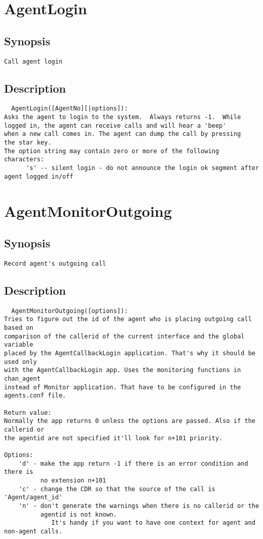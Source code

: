 \section{AgentLogin}
\subsection{Synopsis}
\begin{verbatim}
Call agent login
\end{verbatim}
\subsection{Description}
\begin{verbatim}
  AgentLogin([AgentNo][|options]):
Asks the agent to login to the system.  Always returns -1.  While
logged in, the agent can receive calls and will hear a 'beep'
when a new call comes in. The agent can dump the call by pressing
the star key.
The option string may contain zero or more of the following characters:
      's' -- silent login - do not announce the login ok segment after agent logged in/off

\end{verbatim}


\section{AgentMonitorOutgoing}
\subsection{Synopsis}
\begin{verbatim}
Record agent's outgoing call
\end{verbatim}
\subsection{Description}
\begin{verbatim}
  AgentMonitorOutgoing([options]):
Tries to figure out the id of the agent who is placing outgoing call based on
comparison of the callerid of the current interface and the global variable 
placed by the AgentCallbackLogin application. That's why it should be used only
with the AgentCallbackLogin app. Uses the monitoring functions in chan_agent 
instead of Monitor application. That have to be configured in the agents.conf file.

Return value:
Normally the app returns 0 unless the options are passed. Also if the callerid or
the agentid are not specified it'll look for n+101 priority.

Options:
	'd' - make the app return -1 if there is an error condition and there is
	      no extension n+101
	'c' - change the CDR so that the source of the call is 'Agent/agent_id'
	'n' - don't generate the warnings when there is no callerid or the
	      agentid is not known.
             It's handy if you want to have one context for agent and non-agent calls.

\end{verbatim}


